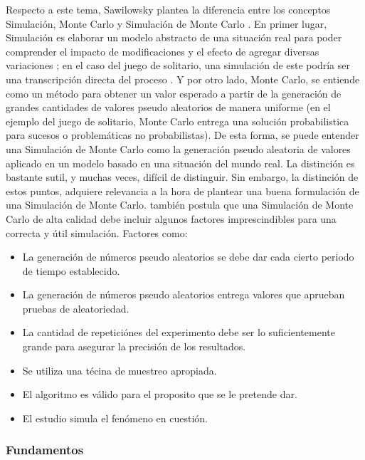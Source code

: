 \noindent Respecto a este tema, Sawilowsky plantea la diferencia entre los conceptos Simulación, Monte Carlo y Simulación de Monte Carlo \cite{sawilowsky2003}. En primer lugar, Simulación es elaborar un modelo abstracto de una situación real para poder comprender el impacto de modificaciones y el efecto de agregar diversas variaciones \citep{negoita1987}; en el caso del juego de solitario, una simulación de este podría ser una transcripción directa del proceso \citeyear{sawilowsky2003}. Y por otro lado, Monte Carlo, se entiende como un método para obtener un valor esperado a partir de la generación de grandes cantidades de valores pseudo aleatorios de manera uniforme (en el ejemplo del juego de solitario, Monte Carlo entrega una solución probabilistica para sucesos o problemáticas no probabilistas). De esta forma, se puede entender una Simulación de Monte Carlo como la generación pseudo aleatoria de valores aplicado en un modelo basado en una situación del mundo real. La distinción es bastante sutil, y muchas veces, difícil de distinguir. Sin embargo, la distinción de estos puntos, adquiere relevancia a la hora de plantear una buena formulación de una Simulación de Monte Carlo.
\newline \newline
\cite{sawilowsky2003} también postula que una Simulación de Monte Carlo de alta calidad debe incluir algunos factores imprescindibles para una correcta y útil simulación. Factores como:
\begin{itemize}
    \item La generación de números pseudo aleatorios se debe dar cada cierto periodo de tiempo establecido.
    \item La generación de números pseudo aleatorios entrega valores que aprueban pruebas de aleatoriedad.
    \item La cantidad de repeticiónes del experimento debe ser lo suficientemente grande para asegurar la precisión de los resultados.
    \item Se utiliza una técina de muestreo apropiada.
    \item El algoritmo es válido para el proposito que se le pretende dar.
    \item El estudio simula el fenómeno en cuestión.
\end{itemize}

\subsubsection{Fundamentos} %

